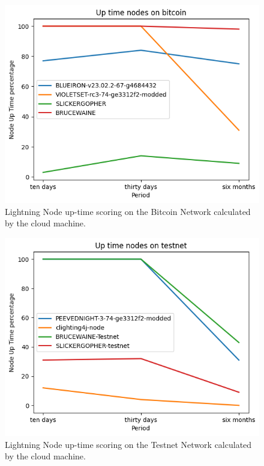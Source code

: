 \begin{figure}
    \begin{center}
      \includegraphics[scale=0.7]{imgs/bitcoin_uptime.png}
    \end{center}
    \caption{Lightning Node up-time scoring on the Bitcoin Network calculated by the cloud machine.}
    \label{fig:lnmetrics_uptime_bitcoin}
\end{figure}

\begin{figure}
    \begin{center}
      \includegraphics[scale=0.7]{imgs/testnet_uptime.png}
    \end{center}
    \caption{Lightning Node up-time scoring on the Testnet Network calculated by the cloud machine.}
    \label{fig:lnmetrics_uptime_testnet}
\end{figure}


